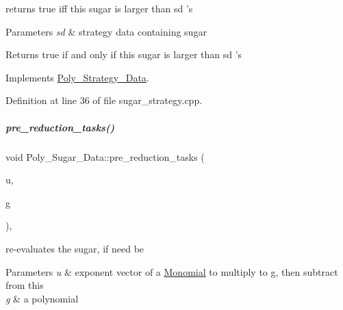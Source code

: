 returns {\ttfamily true} iff {\ttfamily this} sugar is larger than {\ttfamily sd} 's 


\begin{DoxyParams}{Parameters}
{\em sd} & strategy data containing sugar \\
\hline
\end{DoxyParams}
\begin{DoxyReturn}{Returns}
{\ttfamily true} if and only if {\ttfamily this} sugar is larger than {\ttfamily sd} 's 
\end{DoxyReturn}


Implements \hyperlink{group__strategygroup_a6cd4608015a6b0f06141b9b73b0d4137}{Poly\+\_\+\+Strategy\+\_\+\+Data}.



Definition at line 36 of file sugar\+\_\+strategy.\+cpp.

\mbox{\label{group__strategygroup_a284ca31b353017bdf4ea9b331218fff4}} 
\subparagraph{\texorpdfstring{pre\+\_\+reduction\+\_\+tasks()}{pre\_reduction\_tasks()}\hspace{0.1cm}{\footnotesize\ttfamily [1/2]}}
{\footnotesize\ttfamily void Poly\+\_\+\+Sugar\+\_\+\+Data\+::pre\+\_\+reduction\+\_\+tasks (\begin{DoxyParamCaption}\item[{const E\+X\+P\+\_\+\+T\+Y\+PE $\ast$}]{u,  }\item[{const \hyperlink{group__polygroup_class_abstract___polynomial}{Abstract\+\_\+\+Polynomial} \&}]{g }\end{DoxyParamCaption})\hspace{0.3cm}{\ttfamily [override]}, {\ttfamily [virtual]}}



re-\/evaluates the sugar, if need be 


\begin{DoxyParams}{Parameters}
{\em u} & exponent vector of a \hyperlink{group__polygroup_class_monomial}{Monomial} to multiply to {\ttfamily g}, then subtract from {\ttfamily this} \\
\hline
{\em g} & a polynomial \\
\hline
\end{DoxyParams}


